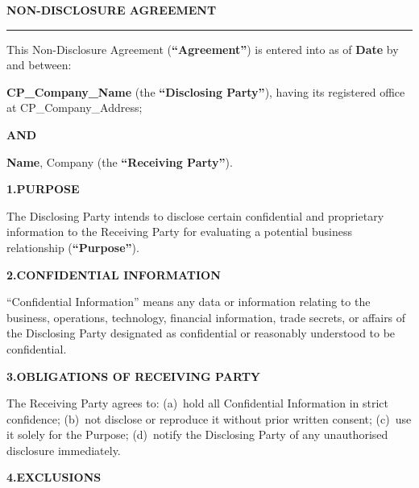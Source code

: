 \documentclass[9.5pt]{article}
\begin{document}
\vspace*{18pt}

{\fontsize{14pt}{17pt}\selectfont\bfseries\color{t2ldark}NON-DISCLOSURE AGREEMENT}\par\vspace{2pt}
{\color{refgold}\rule{\linewidth}{1pt}}\par\vspace{8pt}

{\fontsize{9.5pt}{13.5pt}\selectfont\color{refcharcoal}

This Non-Disclosure Agreement (\textbf{``Agreement''}) is entered into as of
\textbf{{{Date}}} by and between:

\vspace{5pt}
\textbf{{{CP_Company_Name}}} (the \textbf{``Disclosing Party''}), having its
registered office at {{CP_Company_Address}};

\vspace{3pt}\textbf{AND}\vspace{3pt}

\textbf{{{Name}}}, {{Company}} (the \textbf{``Receiving Party''}).

\vspace{6pt}
\textbf{\color{t2ldark}1.\enspace PURPOSE}

The Disclosing Party intends to disclose certain confidential and proprietary
information to the Receiving Party for evaluating a potential business
relationship (\textbf{``Purpose''}).

\vspace{5pt}
\textbf{\color{t2ldark}2.\enspace CONFIDENTIAL INFORMATION}

``Confidential Information'' means any data or information relating to the
business, operations, technology, financial information, trade secrets, or
affairs of the Disclosing Party designated as confidential or reasonably
understood to be confidential.

\vspace{5pt}
\textbf{\color{t2ldark}3.\enspace OBLIGATIONS OF RECEIVING PARTY}

The Receiving Party agrees to: (a)~hold all Confidential Information in strict
confidence; (b)~not disclose or reproduce it without prior written consent;
(c)~use it solely for the Purpose; (d)~notify the Disclosing Party of any
unauthorised disclosure immediately.

\vspace{5pt}
\textbf{\color{t2ldark}4.\enspace EXCLUSIONS}

}
\end{document}
